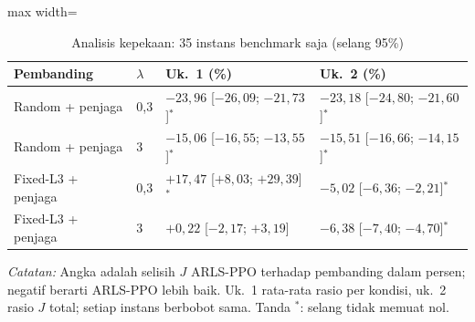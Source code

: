 \begin{table}[htbp]
\caption{Analisis kepekaan: 35 instans benchmark saja (selang 95\%)}
\label{tab:uji-kepekaan}
\centering\footnotesize
\setlength{\tabcolsep}{4pt}
\begin{adjustbox}{max width=\textwidth}
\begin{tabular}{llll}
\toprule
Pembanding & $\lambda$ & Uk.~1 (\%) & Uk.~2 (\%) \\
\midrule
Random + penjaga & 0{,}3 & $-23{,}96$ [$-26{,}09$; $-21{,}73$]$^{*}$ & $-23{,}18$ [$-24{,}80$; $-21{,}60$]$^{*}$ \\
Random + penjaga & 3 & $-15{,}06$ [$-16{,}55$; $-13{,}55$]$^{*}$ & $-15{,}51$ [$-16{,}66$; $-14{,}15$]$^{*}$ \\
Fixed-L3 + penjaga & 0{,}3 & $+17{,}47$ [$+8{,}03$; $+29{,}39$]$^{*}$ & $-5{,}02$ [$-6{,}36$; $-2{,}21$]$^{*}$ \\
Fixed-L3 + penjaga & 3 & $+0{,}22$ [$-2{,}17$; $+3{,}19$] & $-6{,}38$ [$-7{,}40$; $-4{,}70$]$^{*}$ \\
\bottomrule
\end{tabular}
\end{adjustbox}
\par\smallskip\footnotesize\textit{Catatan:} Angka adalah selisih $J$ ARLS-PPO terhadap pembanding dalam persen; negatif berarti ARLS-PPO lebih baik. Uk.~1 rata-rata rasio per kondisi, uk.~2 rasio $J$ total; setiap instans berbobot sama. Tanda $^{*}$: selang tidak memuat nol.
\end{table}
